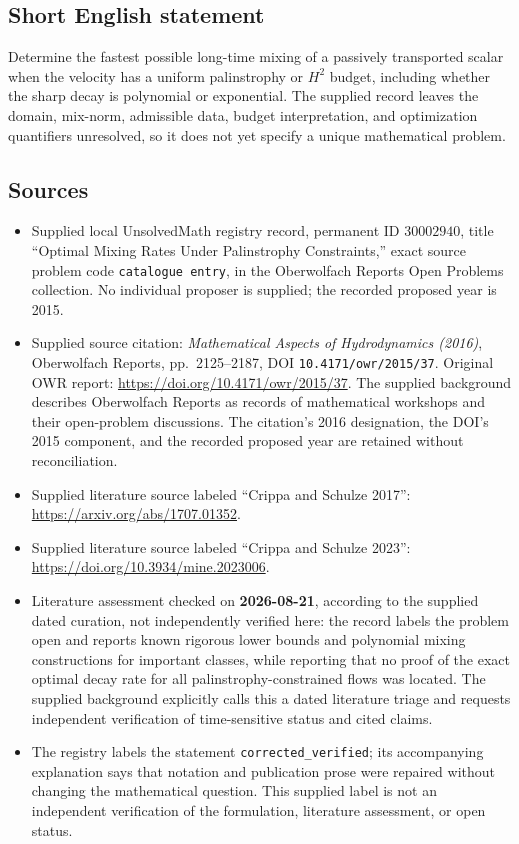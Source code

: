 \documentclass[11pt]{article}
\begin{document}
\subsection{Short English statement}
Determine the fastest possible long-time mixing of a passively transported scalar when the velocity has a uniform palinstrophy or \(H^2\) budget, including whether the sharp decay is polynomial or exponential. The supplied record leaves the domain, mix-norm, admissible data, budget interpretation, and optimization quantifiers unresolved, so it does not yet specify a unique mathematical problem.
\subsection{Sources}
\begin{itemize}
\item Supplied local UnsolvedMath registry record, permanent ID \(30002940\), title ``Optimal Mixing Rates Under Palinstrophy Constraints,'' exact source problem code \texttt{catalogue entry}, in the Oberwolfach Reports Open Problems collection. No individual proposer is supplied; the recorded proposed year is 2015.
\item Supplied source citation: \emph{Mathematical Aspects of Hydrodynamics (2016)}, Oberwolfach Reports, pp.\ 2125--2187, DOI \texttt{10.4171/owr/2015/37}. Original OWR report: \url{https://doi.org/10.4171/owr/2015/37}. The supplied background describes Oberwolfach Reports as records of mathematical workshops and their open-problem discussions. The citation's 2016 designation, the DOI's 2015 component, and the recorded proposed year are retained without reconciliation.
\item Supplied literature source labeled ``Crippa and Schulze 2017'': \url{https://arxiv.org/abs/1707.01352}.
\item Supplied literature source labeled ``Crippa and Schulze 2023'': \url{https://doi.org/10.3934/mine.2023006}.
\item Literature assessment checked on \textbf{2026-08-21}, according to the supplied dated curation, not independently verified here: the record labels the problem open and reports known rigorous lower bounds and polynomial mixing constructions for important classes, while reporting that no proof of the exact optimal decay rate for all palinstrophy-constrained flows was located. The supplied background explicitly calls this a dated literature triage and requests independent verification of time-sensitive status and cited claims.
\item The registry labels the statement \texttt{corrected\_verified}; its accompanying explanation says that notation and publication prose were repaired without changing the mathematical question. This supplied label is not an independent verification of the formulation, literature assessment, or open status.
\end{itemize}
\end{document}
